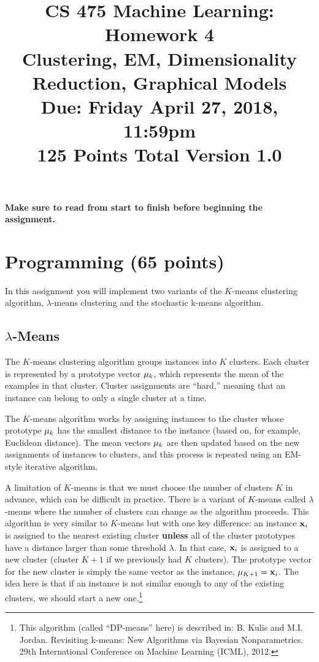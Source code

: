 \documentclass[11pt]{article}
\title{CS 475 Machine Learning: Homework 4\\Clustering, EM, Dimensionality Reduction, Graphical Models\\
	\Large{Due: Friday April 27, 2018, 11:59pm}\\
	125 Points Total \hspace{1cm} Version 1.0}
\author{}
\date{}
\newcommand{\vxi}{{\bf x}_i}
\newcommand{\vmu}{{\bf \mu}}
\newcommand{\vmuk}{{\bf \mu}_k}
\begin{document}
	\large
	\maketitle
	\thispagestyle{headings}
	
	\vspace{-.5in}
	
	{\bf Make sure to read from start to finish before beginning the assignment.}
\section{Programming (65 points)}

In this assignment you will implement two variants of the $K$-means clustering algorithm, $\lambda$-means clustering and the stochastic k-means algorithm.

\subsection{$\lambda$-Means}
The $K$-means clustering algorithm groups instances into $K$ clusters. Each cluster is represented by a prototype vector $\vmuk$, which represents the mean of the examples in that cluster. Cluster assignments are ``hard,'' meaning that an instance can belong to only a single cluster at a time.

The $K$-means algorithm works by assigning instances to the cluster whose prototype $\vmuk$ has the smallest distance to the instance (based on, for example, Euclidean distance). The mean vectors $\vmuk$ are then updated based on the new assignments of instances to clusters, and this process is repeated using an EM-style iterative algorithm.

A limitation of $K$-means is that we must choose the number of clusters $K$ in advance, which can be difficult in practice. There is a variant of $K$-means called $\lambda$-means where the number of clusters can change as the algorithm proceeds. This algorithm is very similar to $K$-means but with one key difference: an instance $\vxi$ is assigned to the nearest existing cluster {\bf unless} all of the cluster prototypes have a distance larger than some threshold $\lambda$. In that case, $\vxi$ is assigned to a new cluster (cluster $K+1$ if we previously had $K$ clusters). The prototype vector for the new cluster is simply the same vector as the instance, $\vmu_{K+1} = \vxi$.
The idea here is that if an instance is not similar enough to any of the existing clusters, we should start a new one.\footnote{This algorithm (called ``DP-means'' here) is described in: B. Kulis and M.I. Jordan. Revisiting k-means: New Algorithms via Bayesian Nonparametrics. 29th International Conference on Machine Learning (ICML), 2012.}
\end{document}
